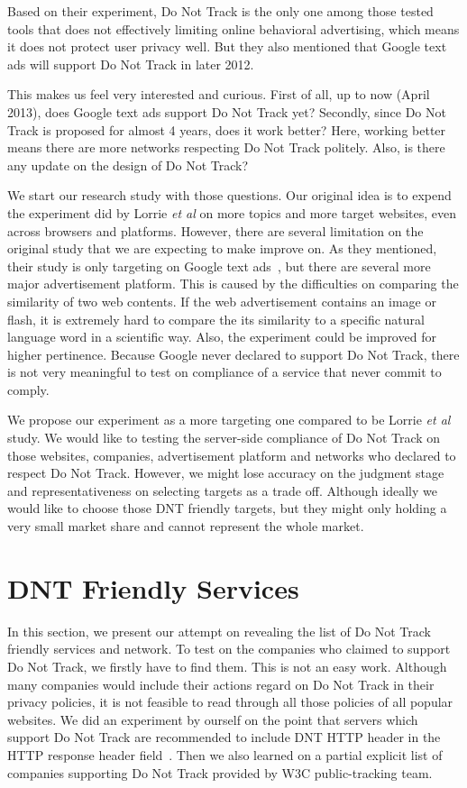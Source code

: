 \documentclass{sig-alternate}
\begin{document}
Based on their experiment, Do Not Track is the only one among those tested tools that does not effectively limiting online behavioral advertising, which means it does not protect user privacy well. But they also mentioned that Google text ads will support Do Not Track in later 2012.

This makes us feel very interested and curious. First of all, up to now (April 2013), does Google text ads support Do Not Track yet? Secondly, since Do Not Track is proposed for almost 4 years, does it work better? Here, working better means there are more networks respecting Do Not Track politely. Also, is there any update on the design of Do Not Track?

We start our research study with those questions. Our original idea is to expend the experiment did by Lorrie \emph{et al} on more topics and more target websites, even across browsers and platforms. However, there are several limitation on the original study that we are expecting to make improve on. As they mentioned, their study is only targeting on Google text ads~\cite{balebako2012measuring}, but there are several more major advertisement platform. This is caused by the difficulties on comparing the similarity of two web contents. If the web advertisement contains an image or flash, it is extremely hard to compare the its similarity to a specific natural language word in a scientific way. Also, the experiment could be improved for higher pertinence. Because Google never declared to support Do Not Track, there is not very meaningful to test on compliance of a service that never commit to comply. 

We propose our experiment as a more targeting one compared to be Lorrie \emph{et al} study. We would like to testing the server-side compliance of Do Not Track on those websites, companies, advertisement platform and networks who declared to respect Do Not Track. However, we might lose accuracy on the judgment stage and representativeness on selecting targets as a trade off. Although ideally we would like to choose those DNT friendly targets, but they might only holding a very small market share and cannot represent the whole market.

\section{DNT Friendly Services} \label{sec:services}

In this section, we present our attempt on revealing the list of Do Not Track friendly services and network. To test on the companies who claimed to support Do Not Track, we firstly have to find them. This is not an easy work. Although many companies would include their actions regard on Do Not Track in their privacy policies, it is not feasible to read through all those policies of all popular websites. We did an experiment by ourself on the point that servers which support Do Not Track are recommended to include DNT HTTP header in the HTTP response header field~\cite{dntdraft}. Then we also learned on a partial explicit list of companies supporting Do Not Track provided by W3C public-tracking team.
\end{document}

